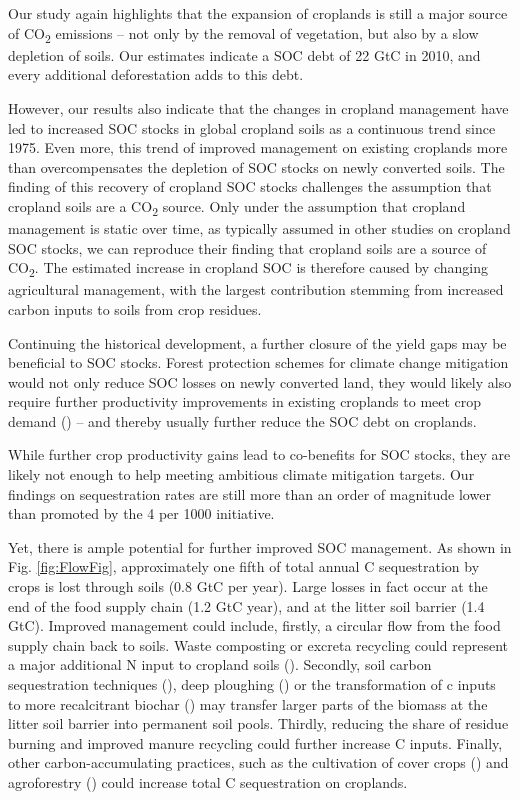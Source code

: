 \documentclass[gc, manuscript]{copernicus}
\begin{document}
Our study again highlights that the expansion of croplands is still a major source of CO\textsubscript{2} emissions -- not only by the removal of vegetation, but also by a slow depletion of soils. Our estimates indicate a SOC debt of 22 GtC in 2010, and every additional deforestation adds to this debt.

However, our results also indicate that the changes in cropland management have led to increased SOC stocks in global cropland soils as a continuous trend since 1975. Even more, this trend of improved management on existing croplands more than overcompensates the depletion of SOC stocks on newly converted soils. The finding of this recovery of cropland SOC stocks challenges the assumption that cropland soils are a CO\textsubscript{2} source. Only under the assumption that cropland management is static over time, as typically assumed in other studies on cropland SOC stocks, we can reproduce their finding that cropland soils are a source of CO\textsubscript{2}. The estimated increase in cropland SOC is therefore caused by changing agricultural management, with the largest contribution stemming from increased carbon inputs to soils from crop residues.

Continuing the historical development, a further closure of the yield gaps may be beneficial to SOC stocks. Forest protection schemes for climate change mitigation would not only reduce SOC losses on newly converted land, they would likely also require further productivity improvements in existing croplands to meet crop demand (\citep{popp_land-use_2014-1}) -- and thereby usually further reduce the SOC debt on croplands.

While further crop productivity gains lead to co-benefits for SOC stocks, they are likely not enough to help meeting ambitious climate mitigation targets. Our findings on sequestration rates are still more than an order of magnitude lower than promoted by the 4 per 1000 initiative.

Yet, there is ample potential for further improved SOC management. As shown in Fig. \ref{fig:FlowFig}, approximately one fifth of total annual C sequestration by crops is lost through soils (0.8 GtC per year). Large losses in fact occur at the end of the food supply chain (1.2 GtC year), and at the litter soil barrier (1.4 GtC). Improved management could include, firstly, a circular flow from the food supply chain back to soils. Waste composting or excreta recycling could represent a major additional N input to cropland soils (\citep{brenzinger_organic_2018}). Secondly, soil carbon sequestration techniques (\citep{smith_soil_2016}), deep ploughing (\citep{alcantara_deep_2016}) or the transformation of c inputs to more recalcitrant biochar (\citep{woolf_sustainable_2010}) may transfer larger parts of the biomass at the litter soil barrier into permanent soil pools. Thirdly, reducing the share of residue burning and improved manure recycling could further increase C inputs. Finally, other carbon-accumulating practices, such as the cultivation of cover crops (\citep{poeplau_carbon_2015}) and agroforestry (\citep{lorenz_soil_2014}) could increase total C sequestration on croplands.
\end{document}
